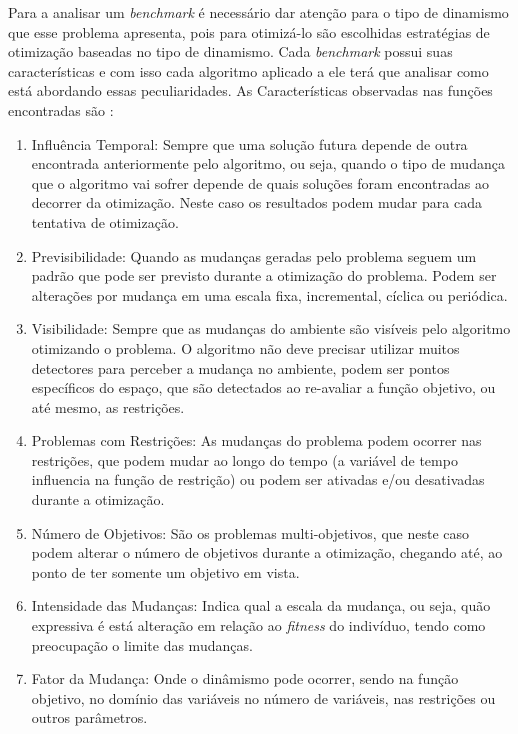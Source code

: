 Para a analisar um \textit{benchmark} é necessário dar atenção para o tipo de dinamismo que esse problema apresenta, pois para otimizá-lo são escolhidas estratégias de otimização baseadas no tipo de dinamismo. Cada \textit{benchmark} possui suas características e com isso cada algoritmo aplicado a ele terá que analisar como está abordando essas peculiaridades. As Características observadas nas funções encontradas são \cite{cruz2011optimization}:

\begin{enumerate}
\item Influência Temporal: Sempre que uma solução futura depende de outra encontrada anteriormente pelo algoritmo, ou seja, quando o tipo de mudança que o algoritmo vai sofrer depende de quais soluções foram encontradas ao decorrer da otimização. Neste caso os resultados podem mudar para cada tentativa de otimização.

\item Previsibilidade: Quando as mudanças geradas pelo problema seguem um padrão que pode ser previsto durante a otimização do problema. Podem ser alterações por mudança em uma escala fixa, incremental, cíclica ou periódica.

\item Visibilidade: Sempre que as mudanças do ambiente são visíveis pelo algoritmo otimizando o problema. O algoritmo não deve precisar utilizar muitos detectores para perceber a mudança no ambiente, podem ser pontos específicos do espaço, que são detectados ao re-avaliar a função objetivo, ou até mesmo, as restrições.

\item Problemas com Restrições: As mudanças do problema podem ocorrer nas restrições, que podem mudar ao longo do tempo (a variável de tempo influencia na função de restrição) ou podem ser ativadas e/ou desativadas durante a otimização.

\item Número de Objetivos: São os problemas multi-objetivos, que neste caso podem alterar o número de objetivos durante a otimização, chegando até, ao ponto de ter somente um objetivo em vista.

\item Intensidade das Mudanças: Indica qual a escala da mudança, ou seja, quão expressiva é está alteração em relação ao \textit{fitness} do indivíduo, tendo como preocupação o limite das mudanças.

\item Fator da Mudança: Onde o dinâmismo pode ocorrer, sendo na função objetivo, no domínio das variáveis no número de variáveis, nas restrições ou outros parâmetros.  
\end{enumerate}

